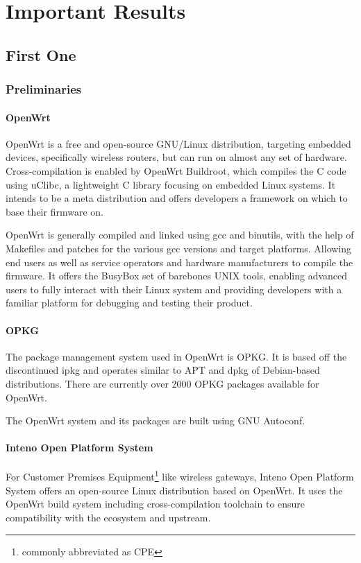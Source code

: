 \documentclass[a4paper,11pt]{kth-mag}
\begin{document}
\part{Important Results}

\chapter{First One}

\section{Preliminaries}

\subsection{OpenWrt}
OpenWrt is a free and open-source GNU/Linux distribution, targeting embedded devices, specifically wireless routers, but can run on almost any set of hardware.
Cross-compilation is enabled by OpenWrt Buildroot, which compiles the C code using uClibc, a lightweight C library focusing on embedded Linux systems. 
It intends to be a meta distribution and offers developers a framework on which to base their firmware on.

OpenWrt is generally compiled and linked using gcc and binutils, with the help of Makefiles and patches for the various gcc versions and target platforms.
Allowing end users as well as service operators and hardware manufacturers to compile the firmware.
It offers the BusyBox set of barebones UNIX tools, enabling advanced users to fully interact with their Linux system and providing developers with a familiar platform for debugging and testing their product.
\cite{OpenWrt:structure_design}

\subsection{OPKG}
The package management system used in OpenWrt is OPKG. It is based off the discontinued ipkg and operates similar to APT and dpkg of Debian-based distributions.
There are currently over 2000 OPKG packages available for OpenWrt.

The OpenWrt system and its packages are built using GNU Autoconf.

\subsection{Inteno Open Platform System}
For Customer Premises Equipment\footnote{commonly abbreviated as CPE} like wireless gateways, Inteno Open Platform System offers an open-source Linux distribution based on OpenWrt.
It uses the OpenWrt build system including cross-compilation toolchain to ensure compatibility with the ecosystem and upstream.
\end{document}
